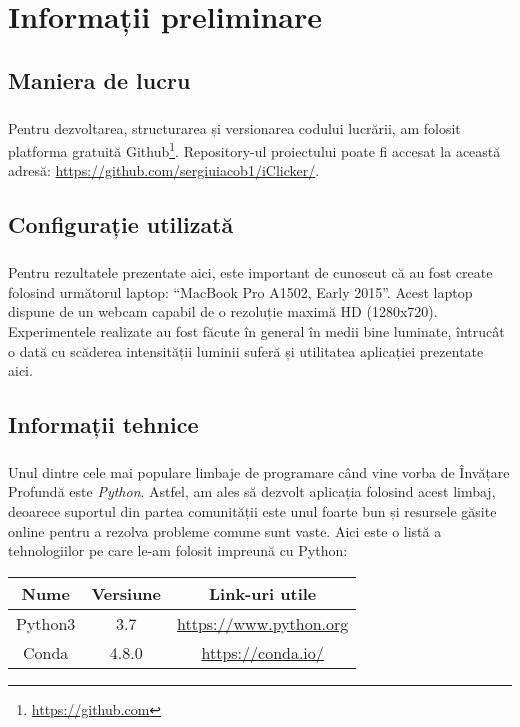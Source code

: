 \chapter{Informații preliminare}
\section{Maniera de lucru}
\paragraph{}
Pentru dezvoltarea, structurarea și versionarea codului lucrării, am folosit platforma gratuită Github\footnote{\url{https://github.com}}.
Repository-ul proiectului poate fi accesat la această adresă: \url{https://github.com/sergiuiacob1/iClicker/}.

\section{Configurație utilizată}
\paragraph{}
Pentru rezultatele prezentate aici, este important de cunoscut că au fost create folosind următorul laptop: ``MacBook Pro A1502, Early 2015''.
Acest laptop dispune de un webcam capabil de o rezoluție maximă HD (1280x720).
Experimentele realizate au fost făcute în general în medii bine luminate, întrucât o dată cu scăderea intensității luminii suferă și utilitatea aplicației prezentate aici.

\section{Informații tehnice}
\paragraph{}
Unul dintre cele mai populare limbaje de programare când vine vorba de Învățare Profundă este \emph{Python}.
Astfel, am ales să dezvolt aplicația folosind acest limbaj, deoarece suportul din partea comunității este unul foarte bun și resursele găsite online pentru a rezolva probleme comune sunt vaste.
Aici este o listă a tehnologiilor pe care le-am folosit impreună cu Python:

\begin{center}
    \begin{tabular}{ c c c }
        Nume & Versiune & Link-uri utile \\
        \hline
        Python3 & 3.7 & \url{https://www.python.org} \\
        Conda & 4.8.0 & \url{https://conda.io/} \\
    \end{tabular}
\end{center}

